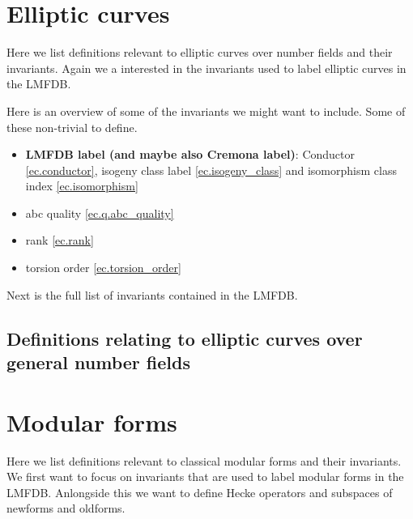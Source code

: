 

\chapter{Elliptic curves}
Here we list definitions relevant to elliptic curves over number fields and their invariants.
Again we a interested in the invariants used to label elliptic curves in the LMFDB.

Here is an overview of some of the invariants we might want to include. Some of these non-trivial to define.

\begin{itemize}
    \item \textbf{LMFDB label (and maybe also Cremona label)}: Conductor \ref{ec.conductor},
      isogeny class label \ref{ec.isogeny_class} and isomorphism class index \ref{ec.isomorphism}
    \item abc quality \ref{ec.q.abc_quality}
    \item rank \ref{ec.rank}
    \item torsion order \ref{ec.torsion_order}
\end{itemize}

Next is the full list of invariants contained in the LMFDB.

\section{Definitions relating to elliptic curves over general number fields}



\chapter{Modular forms}

Here we list definitions relevant to classical modular forms and their invariants. We first want to
focus on invariants that are used to label modular forms in the LMFDB. Anlongside this we want to
define Hecke operators and subspaces of newforms and oldforms.


